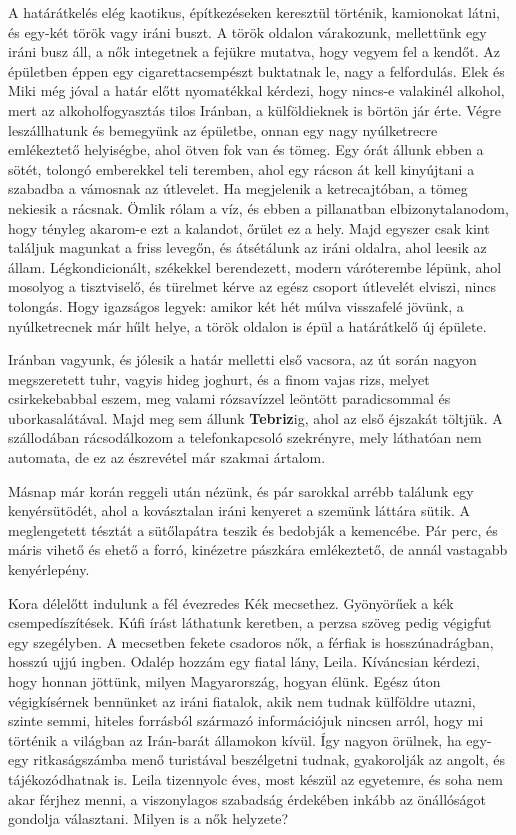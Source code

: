 A határátkelés elég kaotikus, építkezéseken keresztül történik,
kamionokat látni, és egy-két török vagy iráni buszt. A török oldalon
várakozunk, mellettünk egy iráni busz áll, a nők integetnek a fejükre
mutatva, hogy vegyem fel a kendőt. Az épületben éppen egy cigarettacsempészt
buktatnak le, nagy a felfordulás. Elek és Miki még jóval
a határ előtt nyomatékkal kérdezi, hogy nincs-e valakinél alkohol,
mert az alkoholfogyasztás tilos Iránban, a külföldieknek is börtön jár
érte. Végre leszállhatunk és bemegyünk az épületbe, onnan egy nagy
nyúlketrecre emlékeztető helyiségbe, ahol ötven fok van és tömeg. Egy
órát állunk ebben a sötét, tolongó emberekkel teli teremben, ahol egy
rácson át kell kinyújtani a szabadba a vámosnak az útlevelet. Ha megjelenik
a ketrecajtóban, a tömeg nekiesik a rácsnak. Ömlik rólam a víz,
és ebben a pillanatban elbizonytalanodom, hogy tényleg akarom-e ezt
a kalandot, őrület ez a hely. Majd egyszer csak kint találjuk magunkat
a friss levegőn, és átsétálunk az iráni oldalra, ahol leesik az állam.
Légkondicionált, székekkel berendezett, modern váróterembe lépünk,
ahol mosolyog a tisztviselő, és türelmet kérve az egész csoport útlevelét
elviszi, nincs tolongás. Hogy igazságos legyek: amikor két hét múlva
visszafelé jövünk, a nyúlketrecnek már hűlt helye, a török oldalon is
épül a határátkelő új épülete.

Iránban vagyunk, és jólesik a határ melletti első vacsora, az út során nagyon
megszeretett tuhr, vagyis hideg joghurt, és a finom vajas rizs, melyet
csirkekebabbal eszem, meg valami rózsavízzel leöntött paradicsommal
és uborkasalátával. Majd meg sem állunk \textbf{Tebriz}ig, ahol az első
éjszakát
töltjük. A szállodában rácsodálkozom a telefonkapcsoló szekrényre, mely
láthatóan nem automata, de ez az észrevétel már szakmai ártalom.

Másnap már korán reggeli után nézünk, és pár sarokkal arrébb találunk
egy kenyérsütödét, ahol a kovásztalan iráni kenyeret a szemünk
láttára sütik. A meglengetett tésztát a sütőlapátra teszik és bedobják a
kemencébe. Pár perc, és máris vihető és ehető a forró, kinézetre pászkára
emlékeztető, de annál vastagabb kenyérlepény.

Kora délelőtt indulunk a fél évezredes Kék mecsethez. Gyönyörűek
a kék csempedíszítések. Kúfi írást láthatunk keretben, a perzsa szöveg
pedig végigfut egy szegélyben. A mecsetben fekete csadoros nők,
a férfiak is hosszúnadrágban, hosszú ujjú ingben. Odalép hozzám egy
fiatal lány, Leila. Kíváncsian kérdezi, hogy honnan jöttünk, milyen
Magyarország, hogyan élünk. Egész úton végigkísérnek bennünket az
iráni fiatalok, akik nem tudnak külföldre utazni, szinte semmi, hiteles
forrásból származó információjuk nincsen arról, hogy mi történik a
világban az Irán-barát államokon kívül. Így nagyon örülnek, ha egy-egy
ritkaságszámba menő turistával beszélgetni tudnak, gyakorolják
az angolt, és tájékozódhatnak is. Leila tizennyolc éves, most készül az
egyetemre, és soha nem akar férjhez menni, a viszonylagos szabadság
érdekében inkább az önállóságot gondolja választani. Milyen is a nők
helyzete?

